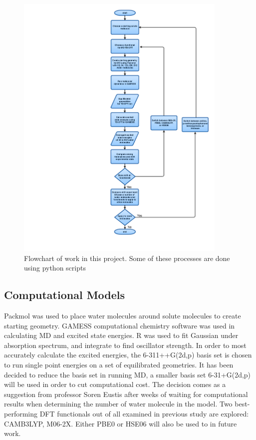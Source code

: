 \documentclass[
journal=jpcbfk, %
manuscript=article]{achemso}
\begin{document}
\begin{figure}[!htb]
	\centering		
	\includegraphics[width=0.9\textwidth]{flowchart.pdf}
	\caption{Flowchart of work in this project. Some of these processes are done using python scripts}
	\label{fig:flowchart}
\end{figure}

\subsection{Computational Models} 
Packmol was used to place water molecules around solute molecules to create starting geometry. GAMESS computational chemistry software was used in calculating MD and excited state energies. R was used to fit Gaussian under absorption spectrum, and integrate to find oscillator strength. In order to most accurately calculate the excited energies, the 6-311++G(2d,p) basis set is chosen to run single point energies on a set of equilibrated geometries. It has been decided to reduce the basis set in running MD, a smaller basis set 6-31+G(2d,p) will be used in order to cut computational cost. The decision comes as a suggestion from professor Soren Eustis after weeks of waiting for computational results when determining the number of water molecule in the model. Two best-performing DFT functionals out of all examined in previous study are explored: CAMB3LYP, M06-2X.\cite{Barnes2014} Either PBE0 or HSE06 will also be used to in future work.
\end{document}

